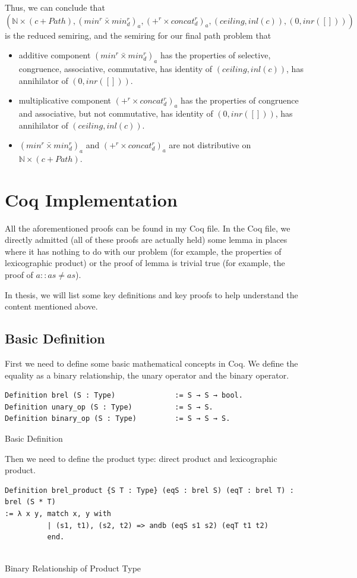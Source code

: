 \documentclass[a4paper,12pt,twoside,openright]{report}
\begin{document}
Thus, we can conclude that \[(\mathbb{N} \times (c + Path),(min^r \bar{\times} min^r_d)_a,(+^r \times concat^r_d)_a,(ceiling,inl(c)),(0,inr([])))\] is the reduced semiring, and the semiring for our final path problem that 
\begin{itemize}
  \item additive component $(min^r \bar{\times} min^r_d)_a$ has the properties of selective, congruence, associative, commutative, has identity of $(ceiling,inl(c))$, has annihilator of $(0,inr([]))$.
  \item multiplicative component $(+^r \times concat^r_d)_a$ has the properties of congruence and associative, but not commutative, has identity of $(0,inr([]))$, has annihilator of $(ceiling,inl(c))$.
  \item $(min^r \bar{\times} min^r_d)_a$ and $(+^r \times concat^r_d)_a$ are not distributive on $\mathbb{N} \times (c + Path)$.
\end{itemize}

\section{Coq Implementation}
All the aforementioned proofs can be found in my Coq file.
In the Coq file, we directly admitted (all of these proofs are actually held) some lemma in places where it has nothing to do with our problem (for example, the properties of lexicographic product) or the proof of lemma is trivial true (for example, the proof of $a::as \neq as$).

In thesis, we will list some key definitions and key proofs to help understand the content mentioned above.

\subsection{Basic Definition}
First we need to define some basic mathematical concepts in Coq. We define the equality as a binary relationship, the unary operator and the binary operator.
\begin{listing}[H]
\begin{verbatim}
Definition brel (S : Type)              := S → S → bool.
Definition unary_op (S : Type)          := S → S. 
Definition binary_op (S : Type)         := S → S → S. 
\end{verbatim}
\caption{Basic Definition} 
\label{coq:def:basic}
\end{listing}

Then we need to define the product type: direct product and lexicographic product.
\begin{listing}[H]
\begin{verbatim}
Definition brel_product {S T : Type} (eqS : brel S) (eqT : brel T) : brel (S * T)
:= λ x y, match x, y with
          | (s1, t1), (s2, t2) => andb (eqS s1 s2) (eqT t1 t2) 
          end.
        
\end{verbatim}
\caption{Binary Relationship of Product Type} 
\label{coq:def:product_relationship}
\end{listing}
\end{document}
